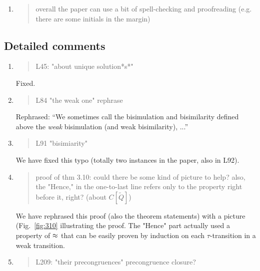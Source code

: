 \begin{enumerate}
\item \begin{quote}
    overall the paper can use a bit of spell-checking and proofreading (e.g. there are some initials in the margin)
  \end{quote}


\end{enumerate}

\subsection*{Detailed comments}

\begin{enumerate}
\item \begin{quote}
    L45: "about unique solution*s*"
  \end{quote}
  Fixed.
  
\item \begin{quote}
    L84 "the weak one" rephrase
  \end{quote}

  Rephrased: ``We sometimes call the bisimulation and bisimilarity defined above
the \emph{weak} bisimulation (and weak bisimilarity), ...''
  
\item \begin{quote}
    L91 "bisimiarity"
  \end{quote}

  We have fixed this typo (totally two instances in the paper, also in L92).
  
\item \begin{quote}
    proof of thm 3.10: could there be some kind of picture to help? also, the "Hence," in the one-to-last line refers only to the property right before it, right? (about $C[\tilde{Q}]$)
  \end{quote}

  We have rephrased this proof (also the theorem statements) with a
  picture (Fig.~\ref{fig:310} illustrating the proof. The "Hence" part
  actually used a property of $\approx$ that can be easily proven by induction
  on each $\tau$-transition in a weak transition.
  
\item \begin{quote}
    L209: "their precongruences" precongruence closure?
  \end{quote}


\end{enumerate}
